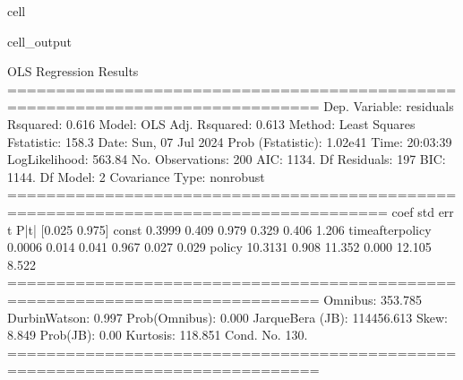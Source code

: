 \documentclass[letterpaper,10pt,english]{jupyterBook}
\begin{document}
\begin{sphinxuseclass}{cell}
\begin{sphinxVerbatimOutput}
\begin{sphinxuseclass}{cell_output}
\begin{sphinxVerbatim}[commandchars=\\\{\}]
                            OLS Regression Results                            
==============================================================================
Dep. Variable:              residuals   R\PYGZhy{}squared:                       0.616
Model:                            OLS   Adj. R\PYGZhy{}squared:                  0.613
Method:                 Least Squares   F\PYGZhy{}statistic:                     158.3
Date:                Sun, 07 Jul 2024   Prob (F\PYGZhy{}statistic):           1.02e\PYGZhy{}41
Time:                        20:03:39   Log\PYGZhy{}Likelihood:                \PYGZhy{}563.84
No. Observations:                 200   AIC:                             1134.
Df Residuals:                     197   BIC:                             1144.
Df Model:                           2                                         
Covariance Type:            nonrobust                                         
=====================================================================================
                        coef    std err          t      P\PYGZgt{}|t|      [0.025      0.975]
\PYGZhy{}\PYGZhy{}\PYGZhy{}\PYGZhy{}\PYGZhy{}\PYGZhy{}\PYGZhy{}\PYGZhy{}\PYGZhy{}\PYGZhy{}\PYGZhy{}\PYGZhy{}\PYGZhy{}\PYGZhy{}\PYGZhy{}\PYGZhy{}\PYGZhy{}\PYGZhy{}\PYGZhy{}\PYGZhy{}\PYGZhy{}\PYGZhy{}\PYGZhy{}\PYGZhy{}\PYGZhy{}\PYGZhy{}\PYGZhy{}\PYGZhy{}\PYGZhy{}\PYGZhy{}\PYGZhy{}\PYGZhy{}\PYGZhy{}\PYGZhy{}\PYGZhy{}\PYGZhy{}\PYGZhy{}\PYGZhy{}\PYGZhy{}\PYGZhy{}\PYGZhy{}\PYGZhy{}\PYGZhy{}\PYGZhy{}\PYGZhy{}\PYGZhy{}\PYGZhy{}\PYGZhy{}\PYGZhy{}\PYGZhy{}\PYGZhy{}\PYGZhy{}\PYGZhy{}\PYGZhy{}\PYGZhy{}\PYGZhy{}\PYGZhy{}\PYGZhy{}\PYGZhy{}\PYGZhy{}\PYGZhy{}\PYGZhy{}\PYGZhy{}\PYGZhy{}\PYGZhy{}\PYGZhy{}\PYGZhy{}\PYGZhy{}\PYGZhy{}\PYGZhy{}\PYGZhy{}\PYGZhy{}\PYGZhy{}\PYGZhy{}\PYGZhy{}\PYGZhy{}\PYGZhy{}\PYGZhy{}\PYGZhy{}\PYGZhy{}\PYGZhy{}\PYGZhy{}\PYGZhy{}\PYGZhy{}\PYGZhy{}
const                 0.3999      0.409      0.979      0.329      \PYGZhy{}0.406       1.206
time\PYGZus{}after\PYGZus{}policy     0.0006      0.014      0.041      0.967      \PYGZhy{}0.027       0.029
policy              \PYGZhy{}10.3131      0.908    \PYGZhy{}11.352      0.000     \PYGZhy{}12.105      \PYGZhy{}8.522
==============================================================================
Omnibus:                      353.785   Durbin\PYGZhy{}Watson:                   0.997
Prob(Omnibus):                  0.000   Jarque\PYGZhy{}Bera (JB):           114456.613
Skew:                           8.849   Prob(JB):                         0.00
Kurtosis:                     118.851   Cond. No.                         130.
==============================================================================


\end{sphinxVerbatim}
\end{sphinxuseclass}
\end{sphinxVerbatimOutput}
\end{sphinxuseclass}
\end{document}
